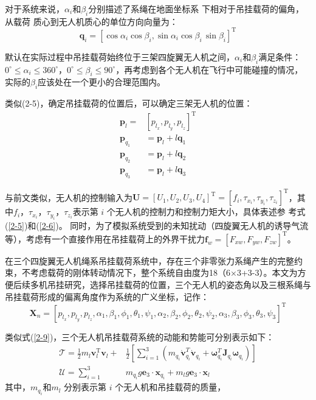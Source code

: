 \documentclass[lang=chs, degree=master, blindreview=true, winfonts=true]{yanputhesis}
\begin{document}
对于系统来说，$\alpha_{i}$和$\beta_i$分别描述了系绳在地面坐标系 下相对于吊挂载荷的偏角，从载荷
质心到无人机质心的单位方向向量为：
\begin{equation}
	\boldsymbol{q}_i=\left[\cos\alpha_i\cos\beta_i,\sin\alpha_i\cos\beta_i\,\sin\beta_i\right]^\mathrm T
\end{equation}

默认在实际过程中吊挂载荷始终位于三架四旋翼无人机之间，$\alpha_{i}$和$\beta_i$满足条件：
$0^\circ\leq\alpha_i\leq360^\circ$，$0^\circ\leq\beta_i\leq90^\circ$，再考虑到各个无人机在飞行中可能碰撞的情况，实际的$\beta_i$应该处在一个更小的合理范围内。

类似(2-5)，确定吊挂载荷的位置后，可以确定三架无人机的位置：
\begin{equation}
\begin{aligned}
	\boldsymbol{p}_{l}=&\left[p_{l_{x}},p_{l_{y}},p_{l_{z}}\right]^{\mathrm{T}} \\
	\boldsymbol{p}_{q_1}&=\boldsymbol{p}_l+l\boldsymbol{q}_1 \\
	\boldsymbol{p}_{q_2}&=\boldsymbol{p}_{l}+l\boldsymbol{q}_{2} \\
	\boldsymbol{p}_{q_3}&=\boldsymbol{p}_l+l\boldsymbol{q}_3
\end{aligned}
\end{equation}

与前文类似，无人机的控制输入为$\bm{U}=\left[U_1,U_2,U_3,U_4\right]^\mathrm{T}=\left[f_i,\tau_{x_i},\tau_{y_i},\tau_{z_i}\right]^\mathrm{T}$，其中$f_{i}$，$\tau_{x_i}$，$\tau_{y_i}$，$\tau_{z_i}$表示第 $i$ 个无人机的控制力和控制力矩大小，具体表述参
考式(\ref{2-5})和(\ref{2-6})。
同时，为了模拟系统受到的未知扰动（四旋翼无人机的诱导气流等），考虑有一个直接作用在吊挂载荷上的外界干扰力${\boldsymbol{f}}_{w}=\left[F_{xw},F_{yw},F_{zw}\right]^\mathrm{T}$。

在三个四旋翼无人机绳系吊挂载荷系统中，存在三个非零张力系绳产生的完整约束，不考虑载荷的刚体转动情况下，整个系统自由度为18（6×3+3-3）。本文为方便后续多机吊挂研究，选择吊挂载荷的位置，三个无人机的姿态角以及三根系绳与吊挂载荷形成的偏离角度作为系统的广义坐标，记作：
$$\boldsymbol{X}_n=
\left[
	p_{l_x} , p_{l_y} , p_{l_z},\alpha_1,\beta_1,\phi_1,\theta_1,\psi_1,\alpha_2,\beta_2,\phi_2,\theta_2,\psi_2,\alpha_3,\beta_3,\phi_3,\theta_3,\psi_3
\right]^\mathrm T$$

类似式(\ref{2-9})，三个无人机吊挂载荷系统的动能和势能可分别表示如下：
\begin{equation}
	\begin{aligned}
	\mathcal{T}=\frac{1}{2}m_{l}{\boldsymbol{v}}_{l}^\mathrm{T}{\boldsymbol{v}}_{l}+&\frac{1}{2}\left[\sum_{i=1}^{3}\left(m_{q_{i}}\dot{\boldsymbol{v}}_{q_{i}}^{T}\dot{\boldsymbol{v}}_{q_{i}}+\boldsymbol{\omega}_{q_{i}}^{T}\boldsymbol{J}_{q_{i}}\boldsymbol{\omega}_{q_{i}}\right)\right] \\
	\mathcal{U}=\sum_{i=1}^{3}&m_{q_{i}}g\boldsymbol{e}_3\cdot\boldsymbol{x}_{q_{i}}+m_{l}g\boldsymbol{e}_3\cdot\boldsymbol{x}_{l}
\end{aligned}
\label{2-18}
\end{equation}
其中，$m_{q_{i}}$和$m_l$ 分别表示第 $i$ 个无人机和吊挂载荷的质量，
\end{document}
